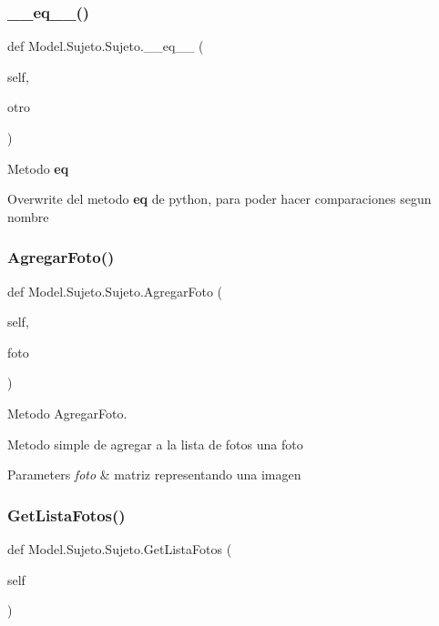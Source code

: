 \subsubsection{\texorpdfstring{\+\_\+\+\_\+eq\+\_\+\+\_\+()}{\_\_eq\_\_()}}
{\footnotesize\ttfamily def Model.\+Sujeto.\+Sujeto.\+\_\+\+\_\+eq\+\_\+\+\_\+ (\begin{DoxyParamCaption}\item[{}]{self,  }\item[{}]{otro }\end{DoxyParamCaption})}



Metodo {\bfseries eq} 

Overwrite del metodo {\bfseries eq} de python, para poder hacer comparaciones segun nombre \mbox{\label{class_model_1_1_sujeto_1_1_sujeto_af477cb1cdb31865d8bba6c7544d2a5ac}} 
\subsubsection{\texorpdfstring{Agregar\+Foto()}{AgregarFoto()}}
{\footnotesize\ttfamily def Model.\+Sujeto.\+Sujeto.\+Agregar\+Foto (\begin{DoxyParamCaption}\item[{}]{self,  }\item[{}]{foto }\end{DoxyParamCaption})}



Metodo Agregar\+Foto. 

Metodo simple de agregar a la lista de fotos una foto 
\begin{DoxyParams}{Parameters}
{\em foto} & matriz representando una imagen \\
\hline
\end{DoxyParams}
\mbox{\label{class_model_1_1_sujeto_1_1_sujeto_a3e6841ef56eaf3a0c918fd7ee6c7e05d}} 
\subsubsection{\texorpdfstring{Get\+Lista\+Fotos()}{GetListaFotos()}}
{\footnotesize\ttfamily def Model.\+Sujeto.\+Sujeto.\+Get\+Lista\+Fotos (\begin{DoxyParamCaption}\item[{}]{self }\end{DoxyParamCaption})}



